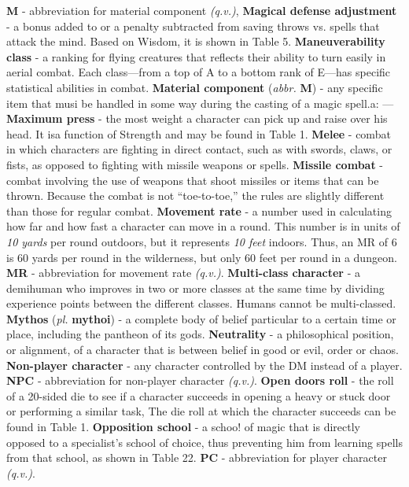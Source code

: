 \documentclass[../main.tex]{subfiles}
\begin{document}
\begin{multicols}{3}
\textbf{M} - abbreviation for material component \textit{(q.v.)},
\textbf{Magical defense adjustment} - a bonus added to or a penalty subtracted from saving throws vs. spells that attack the mind. Based on Wisdom, it is shown in Table 5.
\textbf{Maneuverability class} - a ranking for flying creatures that reflects their ability to turn easily in aerial combat. Each class—from a top of A to a bottom rank of E—has specific statistical abilities in combat.
\textbf{Material component} (\textit{abbr.} \textbf{M}) - any specific item that musi be handled in some way during the casting of a magic spell.a: —
\textbf{Maximum press} - the most weight a character can pick up and raise over his head. It isa function of Strength and may be found in Table 1.
\textbf{Melee} - combat in which characters are fighting in direct contact, such as with swords, claws, or fists, as opposed to fighting with missile weapons or spells.
\textbf{Missile combat} - combat involving the use of weapons that shoot missiles or items that can be thrown. Because the combat is not “toe-to-toe,” the rules are slightly different than those for regular combat.
\textbf{Movement rate} - a number used in calculating how far and how fast a character can move in a round. This number is in units of \textit{10 yards} per round outdoors, but it represents \textit{10 feet} indoors. Thus, an MR of 6 is 60 yards per round in the wilderness, but only 60 feet per round in a dungeon.
\textbf{MR} - abbreviation for movement rate \textit{(q.v.)}.
\textbf{Multi-class character} - a demihuman who improves in two or more classes at the same time by dividing experience points between the different classes. Humans cannot be multi-classed.
\textbf{Mythos} (\textit{pl.} \textbf{mythoi}) - a complete body of belief particular to a certain time or place, including the pantheon of its gods.
\textbf{Neutrality} - a philosophical position, or alignment, of a character that is between belief in good or evil, order or chaos.
\textbf{Non-player character} - any character controlled by the DM instead of a player.
\textbf{NPC} - abbreviation for non-player character \textit{(q.v.)}.
\textbf{Open doors roll} - the roll of a 20-sided die to see if a character succeeds in opening a heavy or stuck door or performing a similar task, The die roll at which the character succeeds can be found in Table 1.
\textbf{Opposition school} - a schoo! of magic that is directly opposed to a specialist's school of choice, thus preventing him from learning spells from that school, as shown in Table 22.
\textbf{PC} - abbreviation for player character \textit{(q.v.)}.

\end{multicols}
\end{document}
